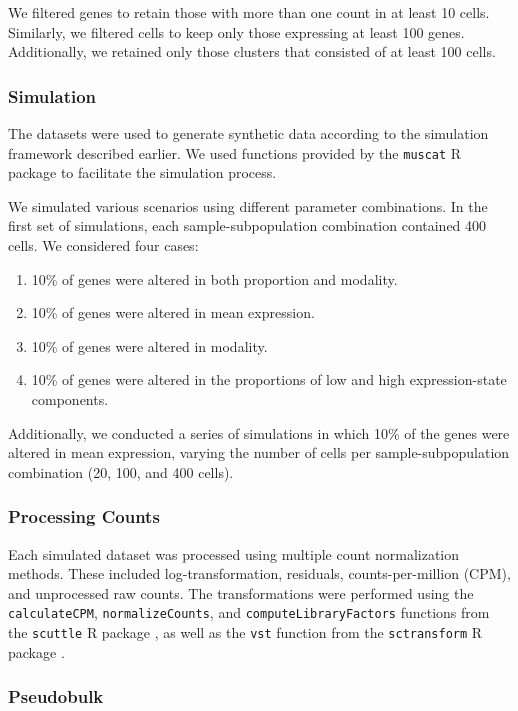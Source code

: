 \documentclass[a4paper, 11pt, twocolumn]{article}
\begin{document}
\begin{multicols}{2}
We filtered genes to retain those with more than one count in at least 10 cells. Similarly, we filtered cells to keep only those expressing at least 100 genes. Additionally, we retained only those clusters that consisted of at least 100 cells.

\subsubsection{Simulation}

The datasets were used to generate synthetic data according to the simulation framework described earlier. We used functions provided by the \texttt{muscat} R package \citep{muscat} to facilitate the simulation process.

We simulated various scenarios using different parameter combinations. In the first set of simulations, each sample-subpopulation combination contained 400 cells. We considered four cases:
\begin{enumerate}
	\item 10\% of genes were altered in both proportion and modality.
	\item 10\% of genes were altered in mean expression.
	\item 10\% of genes were altered in modality.
	\item 10\% of genes were altered in the proportions of low and high expression-state components.
\end{enumerate}

Additionally, we conducted a series of simulations in which 10\% of the genes were altered in mean expression, varying the number of cells per sample-subpopulation combination (20, 100, and 400 cells).

\subsubsection{Processing Counts}

Each simulated dataset was processed using multiple count normalization methods. These included log-transformation, residuals, counts-per-million (CPM), and unprocessed raw counts. The transformations were performed using the \texttt{calculateCPM}, \texttt{normalizeCounts}, and \texttt{computeLibraryFactors} functions from the \texttt{scuttle} R package \citep{scatter}, as well as the \texttt{vst} function from the \texttt{sctransform} R package \citep{sctrans}.

\subsubsection{Pseudobulk}


\end{multicols}
\end{document}
